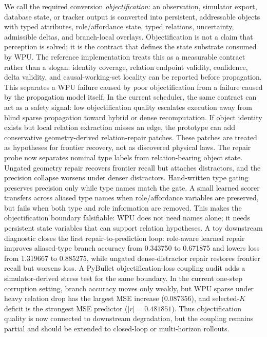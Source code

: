 \documentclass[11pt]{article}
\begin{document}
We call the required conversion \emph{objectification}: an observation,
simulator export, database state, or tracker output is converted into
persistent, addressable objects with typed attributes, role/affordance state,
typed relations, uncertainty, admissible deltas, and branch-local overlays.
Objectification is not a claim that perception is solved; it is the contract that defines the
state substrate consumed by WPU. The reference implementation treats this as a
measurable contract rather than a slogan: identity coverage, relation endpoint
validity, confidence, delta validity, and causal-working-set locality can be
reported before propagation. This separates a WPU failure caused by poor
objectification from a failure caused by the propagation model itself. In the
current scheduler, the same contract can act as a safety signal: low
objectification quality escalates execution away from blind sparse propagation
toward hybrid or dense recomputation.
If object identity exists but local relation extraction misses an edge, the
prototype can add conservative geometry-derived relation-repair patches. These
patches are treated as hypotheses for frontier recovery, not as discovered
physical laws. The repair probe now separates nominal type labels from
relation-bearing object state. Ungated geometry repair recovers frontier recall
but attaches distractors, and the precision collapse worsens under denser
distractors. Hand-written type gating preserves precision only while type names
match the gate. A small learned scorer transfers across aliased type names when
role/affordance variables are preserved, but fails when both type and role
information are removed. This makes the objectification boundary falsifiable:
WPU does not need names alone; it needs persistent state variables that can
support relation hypotheses. A toy downstream diagnostic closes the first
repair-to-prediction loop: role-aware learned repair improves aliased-type
branch accuracy from 0.343750 to 0.671875 and lowers loss from 1.319667 to
0.885275, while ungated dense-distractor repair restores frontier recall but
worsens loss.
A PyBullet objectification-loss coupling audit adds a simulator-derived stress
test for the same boundary. In the current one-step corruption setting, branch
accuracy moves only weakly, but WPU sparse under heavy relation drop has the
largest MSE increase (0.087356), and selected-\(K\) deficit is the strongest MSE
predictor (\(|r|=0.481851\)). Thus objectification quality is now connected to
downstream degradation, but the coupling remains partial and should be extended
to closed-loop or multi-horizon rollouts.
\end{document}
